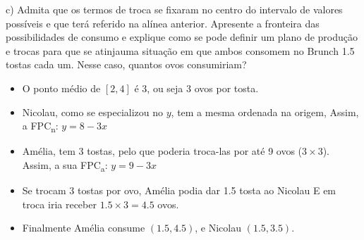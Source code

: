 \documentclass{beamer}
\begin{document}
\begin{frame}
    c) Admita que os termos de troca se fixaram no centro do intervalo de valores
possíveis e que terá referido na alínea anterior. Apresente a fronteira das
possibilidades de consumo e explique como se pode definir um plano de
produção e trocas para que se atinjauma situação em que ambos consomem no
Brunch 1.5 tostas cada um. Nesse caso, quantos ovos consumiriam?

\vspace{0.25in}
\begin{itemize}
    \item<2->{O ponto m\'edio de \([2, 4]\) \'e 3, ou seja 3 ovos por tosta.}
    \item<3->{Nicolau, como se especializou no $y$, tem a mesma ordenada na origem,
    Assim, a FPC\textsubscript{n}: $y = 8 - 3x$}
    \item<4->{Am\'elia, tem 3 tostas, pelo que poderia troca-las por at\'e 9 ovos ($3\times 3$).
    Assim, a sua FPC\textsubscript{a}: $y = 9 - 3x$}
    \item<5-> Se trocam 3 tostas por ovo, Am\'elia podia dar 1.5 tosta ao Nicolau E
    em troca iria receber $1.5 \times 3 = 4.5$ ovos.
    \item<6-> Finalmente Am\'elia consume $(1.5, 4.5)$, e Nicolau $(1.5, 3.5)$.
\end{itemize}

\end{frame}
\end{document}
